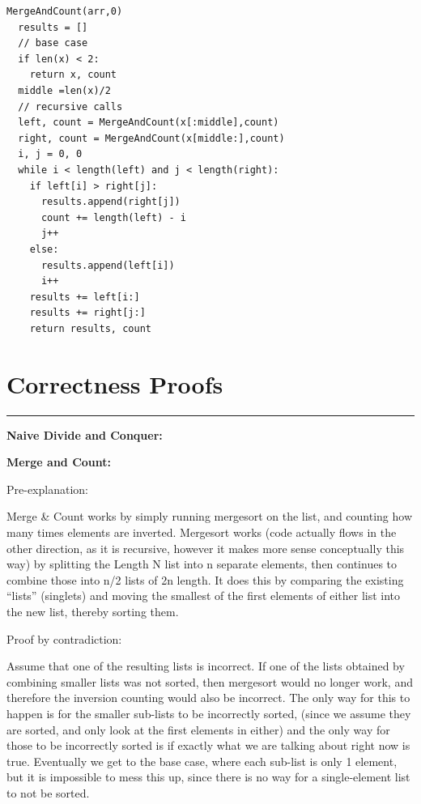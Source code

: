 \documentclass[letterpaper,10pt,titlepage,fleqn]{article}
\begin{document}
\begin{lstlisting}
MergeAndCount(arr,0)
  results = []
  // base case
  if len(x) < 2:
    return x, count
  middle =len(x)/2
  // recursive calls
  left, count = MergeAndCount(x[:middle],count)
  right, count = MergeAndCount(x[middle:],count)
  i, j = 0, 0
  while i < length(left) and j < length(right):
    if left[i] > right[j]:
      results.append(right[j])
      count += length(left) - i
      j++
    else:
      results.append(left[i])
      i++
    results += left[i:]
    results += right[j:]
    return results, count
\end{lstlisting}

\section*{Correctness Proofs}
\hrule

\begin{centering}
\textbf{Naive Divide and Conquer:}
\end{centering}

\begin{centering}
\textbf{Merge and Count:}
\end{centering}

Pre-explanation:

Merge \& Count works by simply running mergesort on the list, and counting how many times elements are inverted.  Mergesort works (code actually flows in the other direction, as it is recursive, however it makes more sense conceptually this way) by splitting the Length N list into n separate elements, then continues to combine those into n/2 lists of 2n length.  It does this by comparing the existing ``lists'' (singlets) and moving the smallest of the first elements of either list into the new list, thereby sorting them.

Proof by contradiction:

Assume that one of the resulting lists is incorrect.  If one of the lists obtained by combining smaller lists was not sorted, then mergesort would no longer work, and therefore the inversion counting would also be incorrect.  The only way for this to happen is for the smaller sub-lists to be incorrectly sorted, (since we assume they are sorted, and only look at the first elements in either) and the only way for those to be incorrectly sorted is if exactly what we are talking about right now is true.  Eventually we get to the base case, where each sub-list is only 1 element, but it is impossible to mess this up, since there is no way for a single-element list to not be sorted.
\end{document}
